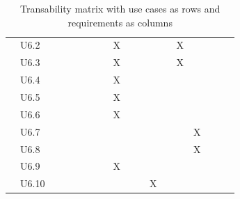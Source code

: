 \documentclass[hidelinks, 12pt, a4paper]{article}
\begin{document}
\begin{table}[H]
\begin{tabular}{|l|l|l|c|c|c|c|c|c|c|c|c|c|c|c|c|c|c|}
             & U6.2  &    &    &    &    &    &    & X  &    &    &     &     & X   &     &     &     \\ \cline{2-17}
             & U6.3  &    &    &    &    &    &    & X  &    &    &     &     & X   &     &     &     \\ \cline{2-17}
             & U6.4  &    &    &    &    &    &    & X  &    &    &     &     &     &     &     &     \\ \cline{2-17}
             & U6.5  &    &    &    &    &    &    & X  &    &    &     &     &     &     &     &     \\ \cline{2-17}
             & U6.6  &    &    &    &    &    &    & X  &    &    &     &     &     &     &     &     \\ \cline{2-17}
             & U6.7  &    &    &    &    &    &    &    &    &    &     &     &     & X   &     &     \\ \cline{2-17}
             & U6.8  &    &    &    &    &    &    &    &    &    &     &     &     & X   &     &     \\ \cline{2-17}
             & U6.9  &    &    &    &    &    &    & X  &    &    &     &     &     &     &     &     \\ \cline{2-17}
             & U6.10 &    &    &    &    &    &    &    &    &    & X   &     &     &     &     &     \\ \cline{1-17}
      \end{tabular}
      \vspace{0.2cm}
      \caption{Transability matrix with use cases as rows and requirements as columns}
      \label{table:ContinuedCould-haveRequirementsTraceabilityMatrix}
\end{table}
\newpage
\end{document}
